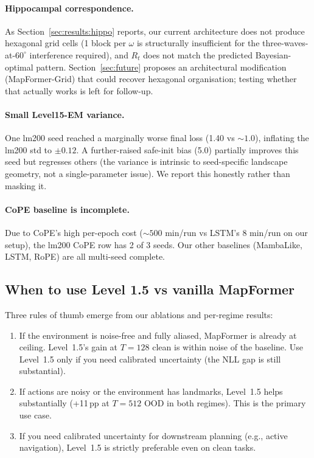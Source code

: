 \paragraph{Hippocampal correspondence.} As
Section~\ref{sec:results:hippo} reports, our current architecture does
not produce hexagonal grid cells (1 block per $\omega$ is structurally
insufficient for the three-waves-at-$60^\circ$ interference required),
and $R_t$ does not match the predicted Bayesian-optimal pattern.
Section~\ref{sec:future} proposes an architectural modification
(MapFormer-Grid) that could recover hexagonal organisation; testing
whether that actually works is left for follow-up.

\paragraph{Small Level15-EM variance.} One lm200 seed reached a
marginally worse final loss (1.40 vs $\sim 1.0$), inflating the lm200
std to $\pm 0.12$. A further-raised safe-init bias (5.0) partially
improves this seed but regresses others (the variance is intrinsic to
seed-specific landscape geometry, not a single-parameter issue). We
report this honestly rather than masking it.

\paragraph{CoPE baseline is incomplete.} Due to CoPE's high per-epoch
cost ($\sim 500$ min/run vs LSTM's 8 min/run on our setup), the lm200
CoPE row has 2 of 3 seeds. Our other baselines (MambaLike, LSTM, RoPE)
are all multi-seed complete.

\subsection{When to use Level 1.5 vs vanilla MapFormer}

Three rules of thumb emerge from our ablations and per-regime results:

\begin{enumerate}
  \item If the environment is noise-free and fully aliased, MapFormer
  is already at ceiling. Level~1.5's gain at $T{=}128$ clean is within
  noise of the baseline. Use Level~1.5 only if you need calibrated
  uncertainty (the NLL gap is still substantial).
  \item If actions are noisy or the environment has landmarks,
  Level~1.5 helps substantially (+11\,pp at $T{=}512$ OOD in both
  regimes). This is the primary use case.
  \item If you need calibrated uncertainty for downstream planning
  (e.g., active navigation), Level~1.5 is strictly preferable even on
  clean tasks.
\end{enumerate}

